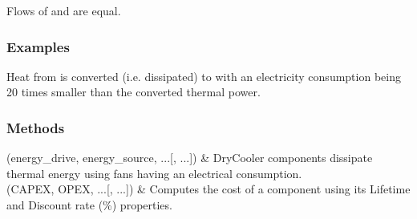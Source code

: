 \documentclass[letterpaper,10pt,english]{sphinxmanual}
\begin{document}
\begin{fulllineitems}
\begin{fulllineitems}
\sphinxAtStartPar
Flows of  and  are equal.
\subsubsection*{Examples}

\begin{sphinxVerbatim}[commandchars=\\\{\}]
       
   
      
\end{sphinxVerbatim}

\sphinxAtStartPar
Heat from  is converted (i.e. dissipated) to  with an electricity consumption being 20 times
smaller than the converted thermal power.

\end{fulllineitems}

\subsubsection*{Methods}


\begin{savenotes}\sphinxattablestart
\centering
\begin{tabulary}{\linewidth}[t]{}
\hline

\sphinxAtStartPar
{\hyperref[\detokenize{generated/tamos.production.DryCooler:tamos.production.DryCooler.__init__}]{}}(energy\_drive, energy\_source, ...{[}, ...{]})
&
\sphinxAtStartPar
DryCooler components dissipate thermal energy using fans having an electrical consumption.
\\
\hline
\sphinxAtStartPar
{\hyperref[\detokenize{generated/tamos.production.DryCooler:tamos.production.DryCooler.compute_actualized_cost}]{}}(CAPEX, OPEX, ...{[}, ...{]})
&
\sphinxAtStartPar
Computes the cost of a component using its \textquotesingle{}Lifetime\textquotesingle{} and \textquotesingle{}Discount rate (\%)\textquotesingle{} properties.
\\
\hline
\end{tabulary}
\par
\sphinxattableend\end{savenotes}

\end{fulllineitems}
\end{document}
